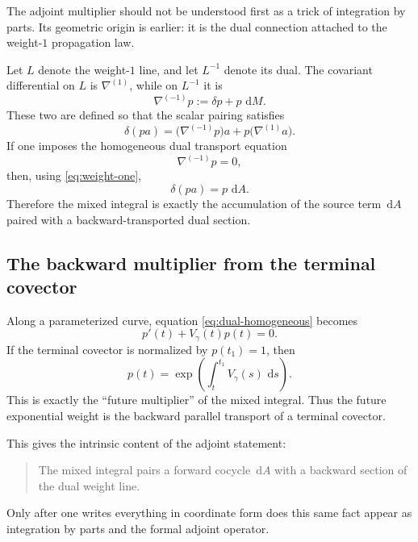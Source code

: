 \documentclass[11pt]{article}
\newcommand{\dd}{\,\mathrm{d}}
\newcommand{\del}{\delta}
\newcommand{\nab}{\nabla}
\begin{document}
The adjoint multiplier should not be understood first as a trick of integration by parts. Its geometric origin is earlier: it is the dual connection attached to the weight-$1$ propagation law.

Let $L$ denote the weight-$1$ line, and let $L^{-1}$ denote its dual. The covariant differential on $L$ is $\nab^{(1)}$, while on $L^{-1}$ it is
\begin{equation}
\label{eq:dual-connection}
\nab^{(-1)}p:=\del p+p\,\dd M.
\end{equation}
These two are defined so that the scalar pairing satisfies
\begin{equation}
\label{eq:pairing-rule}
\del(pa)=\bigl(\nab^{(-1)}p\bigr)a+p\bigl(\nab^{(1)}a\bigr).
\end{equation}
If one imposes the homogeneous dual transport equation
\begin{equation}
\label{eq:dual-homogeneous}
\nab^{(-1)}p=0,
\end{equation}
then, using \eqref{eq:weight-one},
\begin{equation}
\label{eq:dual-pairing}
\del(pa)=p\,\dd A.
\end{equation}
Therefore the mixed integral is exactly the accumulation of the source term $\dd A$ paired with a backward-transported dual section.

\subsection{The backward multiplier from the terminal covector}

Along a parameterized curve, equation \eqref{eq:dual-homogeneous} becomes
\[
p'(t)+V_\gamma(t)p(t)=0.
\]
If the terminal covector is normalized by $p(t_1)=1$, then
\begin{equation}
\label{eq:backward-p}
p(t)=\exp\!\left(\int_t^{t_1} V_\gamma(s)\,\dd s\right).
\end{equation}
This is exactly the ``future multiplier'' of the mixed integral. Thus the future exponential weight is the backward parallel transport of a terminal covector.

This gives the intrinsic content of the adjoint statement:
\begin{quote}
The mixed integral pairs a forward cocycle $\dd A$ with a backward section of the dual weight line.
\end{quote}
Only after one writes everything in coordinate form does this same fact appear as integration by parts and the formal adjoint operator.
\end{document}
